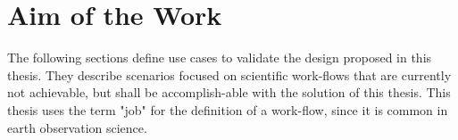 \documentclass[draft,final]{vutinfth} %
\begin{document}

\section{Aim of the Work}\label{Aim}\label{Use Cases}

The following sections define use cases to validate the design proposed in this thesis. They describe scenarios focused on scientific work-flows that are currently not achievable, but shall be accomplish-able with the solution of this thesis. This thesis uses the term "job" for the definition of a work-flow, since it is common in earth observation science.
\end{document}
